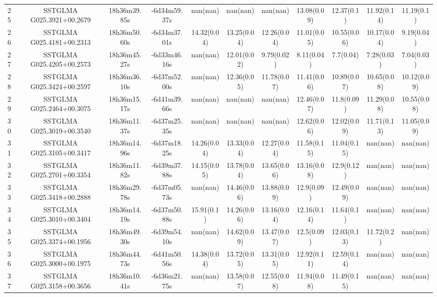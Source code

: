 \begin{table}
{\begin{tabular}[c]{lcccccccccc}
25 & SSTGLMA G025.3921+00.2679 & 18h36m39.85s & -6d34m59.37s & nan(nan)    & nan(nan)    & nan(nan)    & 13.08(0.09) & 12.37(0.1)  & 11.92(0.14) & 11.19(0.1) \\
26 & SSTGLMA G025.4181+00.2313 & 18h36m50.60s & -6d34m37.01s & 14.32(0.04) & 13.25(0.04) & 12.26(0.04) & 11.01(0.05) & 10.55(0.06) & 10.17(0.04) & 9.19(0.04) \\
27 & SSTGLMA G025.4205+00.2573 & 18h36m45.27s & -6d33m46.16s & nan(nan)    & 12.01(0.02) & 9.79(0.02)  & 8.11(0.04)  & 7.7(0.04)   & 7.28(0.03)  & 7.04(0.03) \\
28 & SSTGLMA G025.3424+00.2597 & 18h36m36.10s & -6d37m52.00s & nan(nan)    & 12.36(0.05) & 11.78(0.07) & 11.41(0.06) & 10.89(0.07) & 10.65(0.08) & 10.12(0.09) \\
29 & SSTGLMA G025.2464+00.3075 & 18h36m15.17s & -6d41m39.66s & nan(nan)    & nan(nan)    & nan(nan)    & 12.46(0.07) & 11.8(0.09)  & 11.29(0.08) & 10.55(0.08) \\
30 & SSTGLMA G025.3019+00.3540 & 18h36m11.37s & -6d37m25.35s & nan(nan)    & nan(nan)    & nan(nan)    & 12.62(0.06) & 12.02(0.09) & 11.71(0.13) & 11.05(0.09) \\
31 & SSTGLMA G025.3105+00.3417 & 18h36m14.96s & -6d37m18.25s & 14.26(0.04) & 13.33(0.04) & 12.27(0.04) & 11.58(0.15) & 11.04(0.15) & nan(nan)    & nan(nan) \\
32 & SSTGLMA G025.2701+00.3354 & 18h36m11.82s & -6d39m37.88s & 14.15(0.05) & 13.78(0.04) & 13.65(0.06) & 13.16(0.08) & 12.9(0.12)  & nan(nan)    & nan(nan) \\
33 & SSTGLMA G025.3418+00.2888 & 18h36m29.78s & -6d37m05.73s & nan(nan)    & 14.46(0.06) & 13.88(0.09) & 12.9(0.09)  & 12.49(0.09) & nan(nan)    & nan(nan) \\
34 & SSTGLMA G025.3010+00.3404 & 18h36m14.19s & -6d37m50.88s & 15.91(0.1)  & 14.26(0.06) & 13.16(0.04) & 12.16(0.14) & 11.64(0.1)  & nan(nan)    & nan(nan) \\
35 & SSTGLMA G025.3374+00.1956 & 18h36m49.30s & -6d39m54.10s & nan(nan)    & 14.62(0.09) & 13.47(0.07) & 12.5(0.09)  & 12.03(0.13) & 11.72(0.2)  & nan(nan) \\
36 & SSTGLMA G025.3000+00.1975 & 18h36m44.73s & -6d41m50.56s & 14.38(0.04) & 13.72(0.05) & 13.31(0.05) & 12.92(0.11) & 12.59(0.14) & nan(nan)    & nan(nan) \\
37 & SSTGLMA G025.3158+00.3656 & 18h36m10.41s & -6d36m21.75s & nan(nan)    & 13.58(0.07) & 12.55(0.08) & 11.94(0.08) & 11.49(0.15) & nan(nan)    & nan(nan) \\

\end{tabular}}
\end{table}
